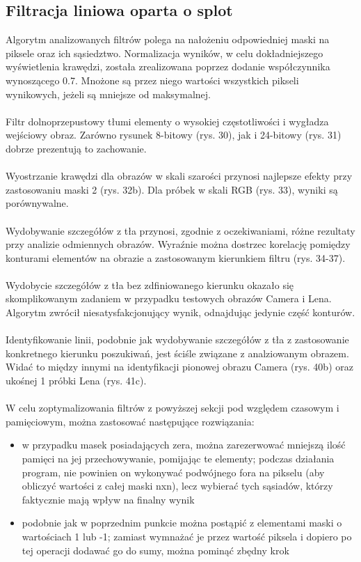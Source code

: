 \documentclass{classrep}
\begin{document}
\subsection{Filtracja liniowa oparta o splot}
Algorytm analizowanych filtrów polega na nałożeniu odpowiedniej maski na piksele oraz ich sąsiedztwo. Normalizacja wyników, w celu dokładniejszego wyświetlenia krawędzi, została zrealizowana poprzez dodanie współczynnika wynoszącego 0.7. Mnożone są przez niego wartości wszystkich pikseli wynikowych, jeżeli są mniejsze od maksymalnej.\\
\\
\indent
Filtr dolnoprzepustowy tłumi elementy o wysokiej częstotliwości i wygładza wejściowy obraz. Zarówno rysunek 8-bitowy (rys. 30), jak i 24-bitowy (rys. 31) dobrze prezentują to zachowanie.\\
\\
\indent
Wyostrzanie krawędzi dla obrazów w skali szarości przynosi najlepsze efekty przy zastosowaniu maski 2 (rys. 32b). Dla próbek w skali RGB (rys. 33), wyniki są porównywalne. \\
\\
\indent
Wydobywanie szczegółów z tła przynosi, zgodnie z oczekiwaniami, różne rezultaty przy analizie odmiennych obrazów. Wyraźnie można dostrzec korelację pomiędzy konturami elementów na obrazie a zastosowanym kierunkiem filtru (rys. 34-37).\\
\\
\indent
Wydobycie szczegółów z tła bez zdfiniowanego kierunku okazało się skomplikowanym zadaniem w przypadku testowych obrazów Camera i Lena. Algorytm zwrócił niesatysfakcjonujący wynik, odnajdując jedynie część konturów.\\
\\
\indent
Identyfikowanie linii, podobnie jak wydobywanie szczegółów z tła z zastosowanie konkretnego kierunku poszukiwań, jest ściśle związane z analziowanym obrazem. Widać to między innymi na identyfikacji pionowej obrazu Camera (rys. 40b) oraz ukośnej 1 próbki Lena (rys. 41c).\\ 
\\
\indent 
W celu zoptymalizowania filtrów z powyższej sekcji pod względem czasowym i pamięciowym, można zastosować następujące rozwiązania:
\begin{itemize}
\item w przypadku masek posiadających zera, można zarezerwować mniejszą ilość pamięci na jej przechowywanie, pomijając te elementy; podczas działania program, nie powinien on wykonywać podwójnego fora na pikselu (aby obliczyć wartości z całej maski nxn), lecz wybierać tych sąsiadów, którzy faktycznie mają wpływ na finalny wynik
\item podobnie jak w poprzednim punkcie można postąpić z elementami maski o wartościach 1 lub -1; zamiast wymnażać je przez wartość piksela i dopiero po tej operacji dodawać go do sumy, można pominąć zbędny krok  
\end{itemize}
\end{document}
